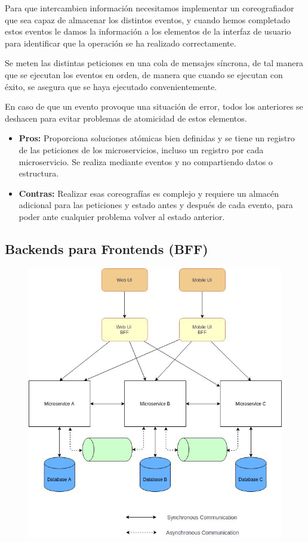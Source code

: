 \documentclass[12pt, twoside, openright]{report} %
\begin{document}
Para que intercambien información necesitamos implementar un coreografiador que sea capaz de almacenar los distintos eventos, y cuando hemos completado estos eventos le damos la información a los elementos de la interfaz de usuario para identificar que la operación se ha realizado correctamente.

Se meten las distintas peticiones en una cola de mensajes síncrona, de tal manera que se ejecutan los eventos en orden, de manera que cuando se ejecutan con éxito, se asegura que se haya ejecutado convenientemente.

En caso de que un evento provoque una situación de error, todos los anteriores se deshacen para evitar problemas de atomicidad de estos elementos.
\begin{itemize}
	\item \textbf{Pros:} Proporciona soluciones atómicas bien definidas y se tiene un registro de las peticiones de los microservicios, incluso un registro por cada microservicio. Se realiza mediante eventos y no compartiendo datos o estructura.
	\item \textbf{Contras:} Realizar esas coreografías es complejo y requiere un almacén adicional para las peticiones y estado antes y después de cada evento,  para poder ante cualquier problema volver al estado anterior.
\end{itemize}

\subsection{Backends para Frontends (BFF)}
\begin{figure}[H]
	{\includegraphics[scale=.3]{1_FCZRcAuSLhrNOjcq1zYXDw.jpeg}}
\end{figure}
\end{document}
